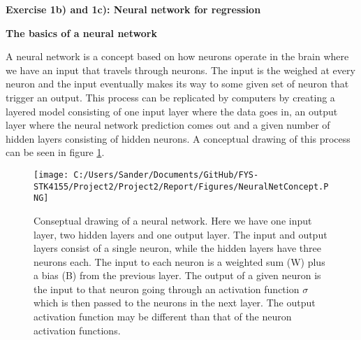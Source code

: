 \documentclass[12pt,a4paper]{article}
\begin{document}
\newpage

\begin{center}
\Large{\textbf{Exercise 1b) and 1c): Neural network for regression}}
\end{center}

\begin{center}
\large{\textbf{The basics of a neural network}}
\end{center}

\noindent A neural network is a concept based on how neurons operate in the brain where we have an input that travels through neurons. The input is the weighed at every neuron and the input eventually makes its way to some given set of neuron that trigger an output. This process can be replicated by computers by creating a layered model consisting of one input layer where the data goes in, an output layer where the neural network prediction comes out and a given number of hidden layers consisting of hidden neurons. A conceptual drawing of this process can be seen in figure \ref{fig:nnconcept}.

\begin{figure}[H]
\centering
\texttt{[image: C:/Users/Sander/Documents/GitHub/FYS-STK4155/Project2/Project2/Report/Figures/NeuralNetConcept.PNG]}
\caption{\label{fig:nnconcept} Conseptual drawing of a neural network. Here we have one input layer, two hidden layers and one output layer. The input and output layers consist of a single neuron, while the hidden layers have three neurons each. The input to each neuron is a weighted sum (W) plus a bias (B) from the previous layer. The output of a given neuron is the input to that neuron going through an activation function $\sigma$ which is then passed to the neurons in the next layer. The output activation function may be different than that of the neuron activation functions.}
\end{figure}
\end{document}
